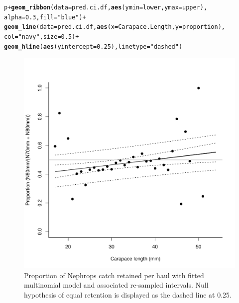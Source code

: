 \documentclass[12pt]{article}\usepackage[]{graphicx}\usepackage[]{color}
\makeatletter
\def\maxwidth{ %
  \ifdim\Gin@nat@width>\linewidth
    \linewidth
  \else
    \Gin@nat@width
  \fi
}
\newcommand{\hlnum}[1]{\textcolor[rgb]{0.686,0.059,0.569}{#1}}%
\newcommand{\hlstr}[1]{\textcolor[rgb]{0.192,0.494,0.8}{#1}}%
\newcommand{\hlopt}[1]{\textcolor[rgb]{0,0,0}{#1}}%
\newcommand{\hlstd}[1]{\textcolor[rgb]{0.345,0.345,0.345}{#1}}%
\newcommand{\hlkwc}[1]{\textcolor[rgb]{0.333,0.667,0.333}{#1}}%
\newcommand{\hlkwd}[1]{\textcolor[rgb]{0.737,0.353,0.396}{\textbf{#1}}}%
\newenvironment{kframe}{%
 \def\at@end@of@kframe{}%
 \ifinner\ifhmode%
  \def\at@end@of@kframe{\end{minipage}}%
  \begin{minipage}{\columnwidth}%
 \fi\fi%
 \def\FrameCommand##1{\hskip\@totalleftmargin \hskip-\fboxsep
 \colorbox{shadecolor}{##1}\hskip-\fboxsep
     \hskip-\linewidth \hskip-\@totalleftmargin \hskip\columnwidth}%
 \MakeFramed {\advance\hsize-\width
   \@totalleftmargin\z@ \linewidth\hsize
   \@setminipage}}%
 {\par\unskip\endMakeFramed%
 \at@end@of@kframe}
\newenvironment{knitrout}{}{} %
\makeatother
\begin{document}
\begin{knitrout}
\begin{kframe}
\begin{alltt}
\hlstd{p} \hlopt{+} \hlkwd{geom_ribbon}\hlstd{(}\hlkwc{data}\hlstd{=pred.ci.df,} \hlkwd{aes}\hlstd{(}\hlkwc{ymin} \hlstd{= lower,} \hlkwc{ymax} \hlstd{= upper),}
                \hlkwc{alpha}\hlstd{=}\hlnum{0.3}\hlstd{,} \hlkwc{fill} \hlstd{=} \hlstr{"blue"}\hlstd{)} \hlopt{+}
  \hlkwd{geom_line}\hlstd{(}\hlkwc{data} \hlstd{= pred.ci.df,} \hlkwd{aes}\hlstd{(}\hlkwc{x} \hlstd{= Carapace.Length,} \hlkwc{y} \hlstd{= proportion),}
            \hlkwc{col} \hlstd{=} \hlstr{"navy"}\hlstd{,} \hlkwc{size} \hlstd{=} \hlnum{0.5}\hlstd{)} \hlopt{+}
  \hlkwd{geom_hline}\hlstd{(}\hlkwd{aes}\hlstd{(}\hlkwc{yintercept} \hlstd{=} \hlnum{0.25}\hlstd{),} \hlkwc{linetype} \hlstd{=} \hlstr{"dashed"}\hlstd{)}
\end{alltt}
\end{kframe}\begin{figure}
\includegraphics[width=\maxwidth]{figure/unnamed-chunk-7-1} \caption[Proportion of Nephrops catch retained per haul with fitted multinomial model and associated re-sampled intervals]{Proportion of Nephrops catch retained per haul with fitted multinomial model and associated re-sampled intervals. Null hypothesis of equal retention is displayed as the dashed line at 0.25.}\label{fig:unnamed-chunk-7}
\end{figure}


\end{knitrout}
\end{document}
